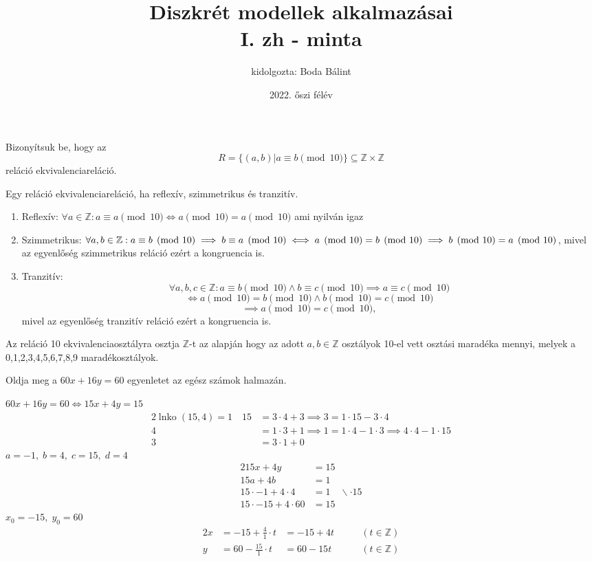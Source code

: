\documentclass[a4paper,12pt]{article}
\title{\huge{Diszkrét modellek alkalmazásai} \\ \large  I. zh - minta}
\author{kidolgozta: Boda Bálint}
\date{2022. őszi félév}
\DeclareMathOperator{\lnko}{lnko}
\theoremstyle{definition}
\begin{document}
	\maketitle
	\begin{question}
		Bizonyítsuk be, hogy az $$ R = \{(a,b) | a \equiv b \pmod{10}\} \subseteq \mathbb{Z} \times \mathbb{Z} $$ reláció ekvivalenciareláció.
	\end{question}
	\begin{solution}
		Egy reláció ekvivalenciareláció, ha reflexív, szimmetrikus és tranzitív.
		\begin{enumerate}
			\item Reflexív: $\forall a \in \mathbb{Z}: a \equiv a \pmod{10} \iff a \pmod{10} = a \pmod{10} $ ami nyilván igaz 
			\item Szimmetrikus: $\forall a,b \in \mathbb{Z}: a \equiv b \pmod{10} \implies b \equiv a \pmod{10} \\ \iff a \pmod{10} = b \pmod{10} \implies b \pmod{10} = a \pmod{10} $, mivel az egyenlőség szimmetrikus reláció ezért a kongruencia is.
			\item Tranzitív: $$\forall a,b,c \in \mathbb{Z}: a \equiv b \pmod{10} \land b \equiv c \pmod {10} \implies a \equiv c \pmod{10} $$
			$$
			\iff a \pmod{10} = b \pmod{10} \land b \pmod{10} = c \pmod{10} $$ $$ \implies a \pmod{10} = c \pmod{10}, $$ mivel az egyenlőség tranzitív reláció ezért a kongruencia is.
		\end{enumerate}
	Az reláció 10 ekvivalenciaosztályra osztja $\mathbb{Z}$-t az alapján hogy az adott $a,b \in \mathbb{Z}$ osztályok 10-el vett osztási maradéka mennyi, melyek a 0,1,2,3,4,5,6,7,8,9 maradékosztályok.
	\end{solution}
	\newpage
	\begin{question}
		Oldja meg a $60x +16y = 60$ egyenletet az egész számok halmazán.
	\end{question}
	\begin{solution}
		$ 60x + 16y = 60 \iff 15x + 4y = 15 $
		\begin{alignat*}{2}
			\lnko{(15,4)} = 1 \quad 15 &= 3 \cdot 4 + 3 \implies 3 = 1 \cdot 15 - 3 \cdot 4 \\
			4 &= 1 \cdot 3 + 1 \implies 1 = 1 \cdot 4 - 1 \cdot 3 \implies 4 \cdot 4 - 1 \cdot 15 \\
			3 &= 3 \cdot 1 + 0
		\end{alignat*}
		$ a = -1,\; b = 4,\; c = 15, \; d=4 $ 
		\begin{alignat*}{2}
			15x + 4y &= 15 \\
			15a + 4b &= 1 \\
			15 \cdot -1 + 4 \cdot 4 &= 1 \quad \backslash \cdot 15 \\
			15 \cdot -15 + 4 \cdot 60 &= 15
		\end{alignat*}
		$ x_0 = -15, \; y_0=60 $
		\begin{alignat*}{2}
			x &= -15 + \frac{4}{1} \cdot t &= -15 + 4t &\qquad (t \in \mathbb{Z}) \\
			y &= 60 - \frac{15}{1} \cdot t &= 60 - 15t &\qquad (t \in \mathbb{Z}) 
		\end{alignat*}
	\end{solution}
\end{document}
